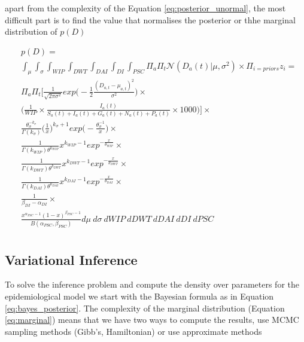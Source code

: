 \documentclass[12pt]{article}
\begin{document}
apart from the complexity of the Equation \ref{eq:posterior_unormal}, the most difficult part is to find the value that normalises the posterior or thhe marginal distribution of $p(D)$

\begin{align}
\label{eq:marginal}
& p(D) =\\ \nonumber
& \int_{\mu} \int_{\sigma} \int_{WIP} \int_{DWT} \int_{DAI} \int_{DI} \int_{PSC} \Pi_{a}\Pi_{t}\mathcal{N}(D_{a}(t)| \mu, \sigma^2) \times \Pi_{i=priors}z_{i} = \\ \nonumber
& \Pi_{a}\Pi_{t} \bigg[ \frac{1}{\sqrt{2\pi \sigma^2}} exp\bigg(-\frac{1}{2}\frac{(D_{a,t} - \mu_{a, t})^{2}}{\sigma^2} \bigg) \times \\\nonumber
& \bigg( \frac{1}{WIP}\times \frac{I_{a}(t)}{S_{a}(t) + I_{a}(t) + G_{a}(t) + N_{a}(t) + P_{a}(t)}\times 1000 \bigg) \bigg] \times \\ \nonumber
& \frac{\theta_{\sigma}^{-k_{\sigma}}}{\Gamma(k_{\sigma})}\bigg(\frac{1}{x} \bigg)^{k_{\sigma} + 1} exp\bigg(-\frac{\theta_{\sigma}^{-1}}{x} \bigg) \times \\ \nonumber
& \frac{1}{\Gamma(k_{WIP})\theta^{k_{WIP}}}x^{k_{WIP}-1}exp^{-\frac{x}{\theta_{WIP}}} \times \\ \nonumber
& \frac{1}{\Gamma(k_{DWT})\theta^{k_{DWT}}}x^{k_{DWT}-1}exp^{-\frac{x}{\theta_{DWT}}} \times \\ \nonumber
& \frac{1}{\Gamma(k_{DAI})\theta^{k_{DAI}}}x^{k_{DAI}-1}exp^{-\frac{x}{\theta_{DAI}}} \times \\ \nonumber
& \frac{1}{\beta_{DI} - \alpha_{DI}}\times \\ \nonumber
& \frac{x^{\alpha_{PSC} - 1} (1 - x)^{\beta_{PSC} - 1}}{B(\alpha_{PSC},\beta_{PSC})} d\mu \: d\sigma \: dWIP \: dDWT \: dDAI \: dDI \: dPSC \\ \nonumber
\end{align}

\subsection{Variational Inference}

To solve the inference problem and compute the density over parameters for the epidemiological model we start with the Bayesian formula as in Equation \ref{eq:bayes_posterior}. The complexity of the marginal distribution (Equation \ref{eq:marginal}) means that we have two ways to compute the results, use MCMC sampling methods (Gibb's, Hamiltonian) or use approximate methods
\end{document}
